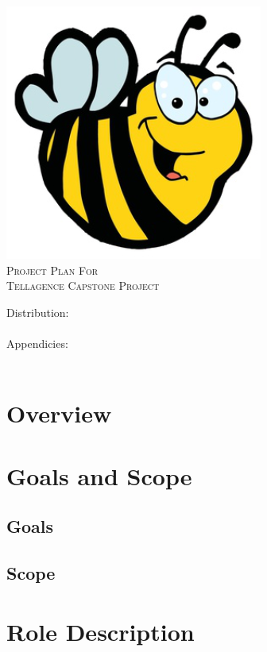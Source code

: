 \documentclass[12pt, letterpaper]{article}
\begin{document}
\begin{titlepage}

\begin{center}
\includegraphics[width=.5\textwidth]{./bee}\\[2cm]
\textsc{\LARGE Project Plan For}\\[1.5cm]
\textsc{\LARGE Tellagence Capstone Project}\\[1.5cm]
\end{center}

\begin{flushleft}
\large Distribution:\\
\hfill \\
\large Appendicies:\\
\hfill \\
\end{flushleft}

\vfill

\end{titlepage}

\tableofcontents
\pagebreak 

\section{Overview}

\section{Goals and Scope}
  \subsection*{Goals}
  \subsection*{Scope}
  
\section{Role Description}
\end{document}
